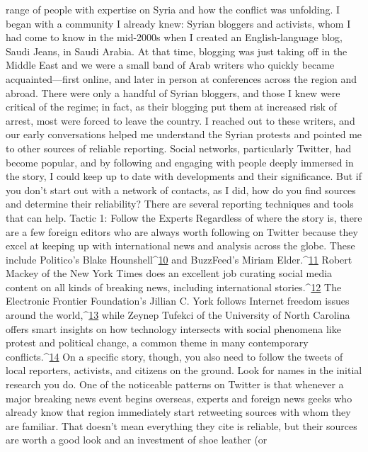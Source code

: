 range of people with expertise on Syria and how the conflict was unfolding. I began with
a community I already knew: Syrian bloggers and activists, whom I had come to know in
the mid-2000s when I created an English-language blog, Saudi Jeans, in Saudi Arabia. At
that time, blogging was just taking off in the Middle East and we were a small band of
Arab writers who quickly became acquainted—first online, and later in person at
conferences across the region and abroad.
There were only a handful of Syrian bloggers, and those I knew were critical of the
regime; in fact, as their blogging put them at increased risk of arrest, most were forced to
leave the country.
I reached out to these writers, and our early conversations helped me understand the
Syrian protests and pointed me to other sources of reliable reporting. Social networks,
particularly Twitter, had become popular, and by following and engaging with
people deeply immersed in the story, I could keep up to date with developments and their
significance.
But if you don’t start out with a network of contacts, as I did, how do you find sources
and determine their reliability? There are several reporting techniques and tools that can
help.
Tactic 1: Follow the Experts
Regardless of where the story is, there are a few foreign editors who are always worth
following on Twitter because they excel at keeping up with international news and
analysis across the globe. These include Politico’s Blake Hounshell^{\href{#endnotes}{10}} and BuzzFeed’s
Miriam Elder.^{\href{#endnotes}{11}} Robert Mackey of the New York Times does an excellent job curating
social media content on all kinds of breaking news, including international stories.^{\href{#endnotes}{12}} The
Electronic Frontier Foundation’s Jillian C. York follows Internet freedom issues around
the world,^{\href{#endnotes}{13}} while Zeynep Tufekci of the University of North Carolina offers smart
insights on how technology intersects with social phenomena like protest and political
change, a common theme in many contemporary conflicts.^{\href{#endnotes}{14}}
On a specific story, though, you also need to follow the tweets of local reporters,
activists, and citizens on the ground. Look for names in the initial research you do. One
of the noticeable patterns on Twitter is that whenever a major breaking news event begins
overseas, experts and foreign news geeks who already know that region immediately start
retweeting sources with whom they are familiar. That doesn’t mean everything they cite
is reliable, but their sources are worth a good look and an investment of shoe leather (or
